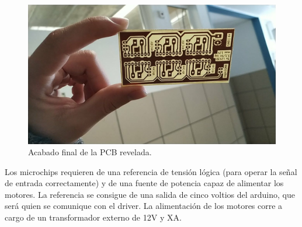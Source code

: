  \begin{figure}[h!]
  	\centering
  	\includegraphics[width=.6\textwidth]{images/hw/pcb_img}
  	\caption{Acabado final de la PCB revelada.}
  \end{figure}
 Los microchips requieren de una referencia de tensión lógica (para operar la señal de entrada correctamente) y de una fuente de potencia capaz de alimentar los motores. La referencia se consigue de una salida de cinco voltios del arduino, que será quien se comunique con el driver. La alimentación de los motores corre a cargo de un transformador externo de 12V y XA.
	
